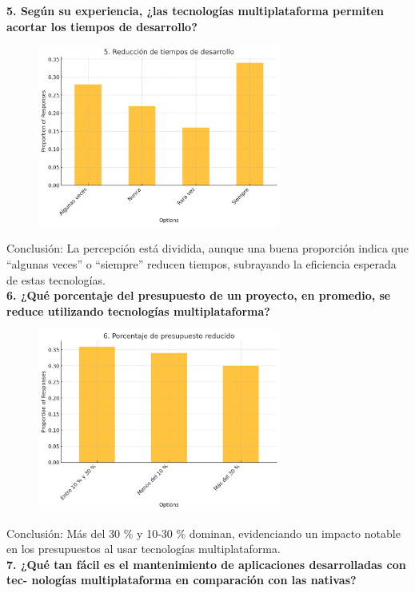 \newpage
\textbf{5. Según su experiencia, ¿las tecnologías multiplataforma permiten acortar los
tiempos de desarrollo?}

\begin{figure}[h!]
    \includegraphics[width=8cm]{images/question5.png}
    \centering
\end{figure}

Conclusión: La percepción está dividida, aunque una buena proporción indica que “algunas veces” o “siempre” reducen tiempos, subrayando la eficiencia esperada de estas tecnologías.\\

\textbf{6. ¿Qué porcentaje del presupuesto de un proyecto, en promedio, se reduce
utilizando tecnologías multiplataforma?}

\begin{figure}[h!]
    \includegraphics[width=8cm]{images/question6.png}
    \centering
\end{figure}

Conclusión: Más del 30 \% y 10-30 \% dominan, evidenciando un impacto notable en los presupuestos al usar tecnologías multiplataforma.\\

\newpage
\textbf{7. ¿Qué tan fácil es el mantenimiento de aplicaciones desarrolladas con tec-
nologías multiplataforma en comparación con las nativas?}

